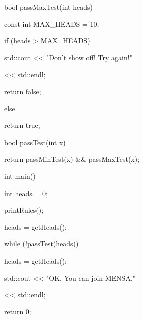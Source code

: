 \begin{consolethree}[escapeinside=||]
bool passMaxTest(int heads)

{

    const int MAX_HEADS = 10;

    if (heads > MAX_HEADS)

    {

        std::cout << "Don't show off! Try again!"

                  << std::endl;

        return false;

    }

    else

        return true;

}



bool passTest(int x)

{

    return passMinTest(x) && passMaxTest(x);

}



int main()

{

    int heads = 0;

    printRules();

    heads = getHeads();

    while (!passTest(heads))

    {

        heads = getHeads();

    }

    std::cout << "OK. You can join MENSA."

              << std::endl;

    return 0;

}

\end{consolethree}

